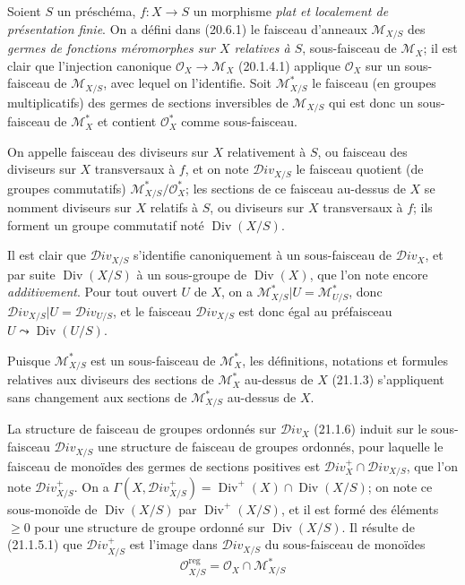 \begin{env}[21.15.1]
\label{IV.21.15.1}
Soient $S$ un préschéma, $f:X\to S$ un morphisme \emph{plat et localement de
présentation finie}. On a défini dans (20.6.1) le faisceau d'anneaux
$\mathscr M_{X/S}$ des \emph{germes de fonctions méromorphes sur $X$ relatives à
$S$}, sous-faisceau de $\mathscr M_X$; il est clair que l'injection canonique
$\mathcal O_X\to\mathscr M_X$ (20.1.4.1) applique $\mathcal O_X$ sur un
sous-faisceau de $\mathscr M_{X/S}$, avec lequel on l'identifie. Soit
$\mathscr M_{X/S}^*$ le faisceau (en groupes multiplicatifs) des germes de sections
inversibles de $\mathscr M_{X/S}$ qui est donc un sous-faisceau de $\mathscr M_X^*$
et contient $\mathcal O_X^*$ comme sous-faisceau.
\end{env}

\begin{definition}[21.15.2]
On appelle faisceau des diviseurs sur $X$ relativement à $S$, ou
faisceau des diviseurs sur $X$ transversaux à $f$, et on note
$\mathscr{D}iv_{X/S}$ le faisceau quotient (de groupes commutatifs)
$\mathscr M_{X/S}^*/\mathcal O_X^*$; les sections de ce faisceau au-dessus de $X$ se
nomment diviseurs sur $X$ relatifs à $S$, ou diviseurs sur $X$
transversaux à $f$; ils forment un groupe commutatif noté $\operatorname{Div}(X/S)$.
\end{definition}

Il est clair que $\mathscr{D}iv_{X/S}$ s'identifie canoniquement à un sous-faisceau de
$\mathscr{D}iv_X$, et par suite $\operatorname{Div}(X/S)$ à un sous-groupe de
$\operatorname{Div}(X)$, que l'on note encore \emph{additivement}. Pour
tout ouvert $U$ de $X$, on a
$\mathscr M_{X/S}^*|U=\mathscr M_{U/S}^*$, donc
$\mathscr{D}iv_{X/S}|U=\mathscr{D}iv_{U/S}$, et le faisceau
$\mathscr{D}iv_{X/S}$ est donc égal au préfaisceau
$U\leadsto\operatorname{Div}(U/S)$.

Puisque $\mathscr M_{X/S}^*$ est un sous-faisceau de $\mathscr M_X^*$, les
définitions, notations et formules relatives aux diviseurs des sections de
$\mathscr M_X^*$ au-dessus de $X$ (21.1.3) s'appliquent sans changement aux sections
de $\mathscr M_{X/S}^*$ au-dessus de $X$.

\begin{env}[21.15.3]
\label{IV.21.15.3}
La structure de faisceau de groupes ordonnés sur $\mathscr{D}iv_X$ (21.1.6) induit
sur le sous-faisceau $\mathscr{D}iv_{X/S}$ une structure de faisceau de groupes
ordonnés, pour laquelle le faisceau de monoïdes des germes de sections positives est
$\mathscr{D}iv_X^+\cap\mathscr{D}iv_{X/S}$, que l'on note
$\mathscr{D}iv_{X/S}^+$. On a
$\Gamma(X,\mathscr{D}iv_{X/S}^+)=\operatorname{Div}^+(X)\cap
\operatorname{Div}(X/S)$; on note ce sous-monoïde de $\operatorname{Div}(X/S)$ par
$\operatorname{Div}^+(X/S)$, et il est formé des éléments $\geq0$ pour une structure
de groupe ordonné sur $\operatorname{Div}(X/S)$. Il résulte de (21.1.5.1) que
$\mathscr{D}iv_{X/S}^+$ est l'image dans $\mathscr{D}iv_{X/S}$ du sous-faisceau de
monoïdes
\[
\label{IV.21.15.3.1}
  \mathcal O_{X/S}^{\mathrm{reg}}=\mathcal O_X\cap\mathscr M_{X/S}^*
  \tag{21.15.3.1}
\]
\end{env}

